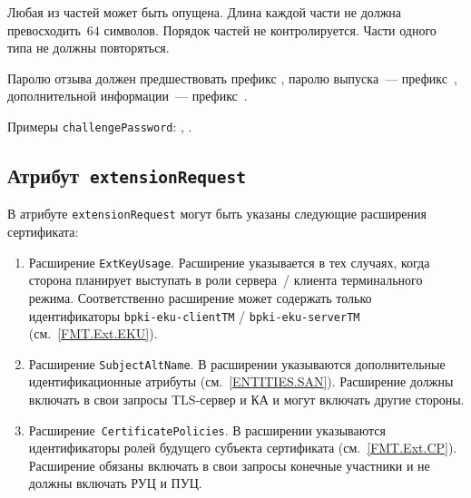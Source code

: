 Любая из частей может быть опущена. Длина каждой части не должна 
превосходить~$64$ символов. Порядок частей не контролируется.
Части одного типа не должны повторяться.

Паролю отзыва должен предшествовать префикс 
, паролю выпуска~--- префикс~,
дополнительной информации~--- префикс~.

Примеры \texttt{challengePassword}:
, .

\subsection{Атрибут~\texttt{extensionRequest}}\label{FMT.CSR.ER}

В атрибуте \texttt{extensionRequest} могут быть указаны следующие 
расширения сертификата:

\begin{enumerate}
\item 
Расширение \texttt{ExtKeyUsage}. Расширение указывается в тех случаях, 
когда сторона планирует выступать в роли сервера~/ клиента терминального 
режима. Соответственно расширение может содержать только идентификаторы  
\verb|bpki-eku-clientTM| / \verb|bpki-eku-serverTM| 
(см.~\ref{FMT.Ext.EKU}). 


\item 
Расширение \texttt{SubjectAltName}. В расширении указываются 
дополнительные идентификационные атрибуты (см.~\ref{ENTITIES.SAN}). 
Расширение должны включать в свои запросы TLS-сервер и КА 
и могут включать другие стороны.

\item
Расширение~\texttt{CertificatePolicies}. В расширении
указываются идентификаторы ролей будущего субъекта сертификата
(см.~\ref{FMT.Ext.CP}).
Расширение обязаны включать в свои запросы конечные участники 
и не должны включать РУЦ и ПУЦ.
\end{enumerate}
